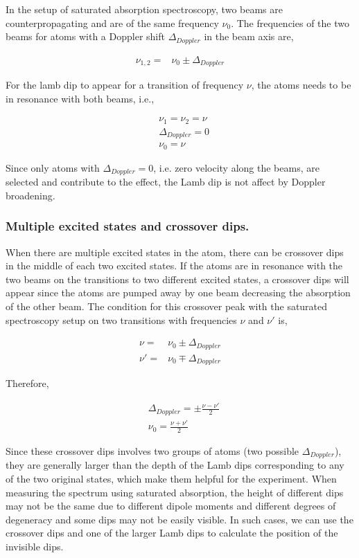 \documentclass[aps,twocolumn,secnumarabic,balancelastpage,amsmath,amssymb,nofootinbib]{revtex4}
\newcommand{\eqar}[1]
{
  \begin{align*}
    #1
  \end{align*}
}
\begin{document}
In the setup of saturated absorption spectroscopy, two beams are counterpropagating and are of the same frequency $\nu_0$. The frequencies of the two beams for atoms with a Doppler shift $\Delta_{Doppler}$ in the beam axis are,
\eqar{
  \nu_{1,2}=&\nu_0\pm\Delta_{Doppler}
}
For the lamb dip to appear for a transition of frequency $\nu$, the atoms needs to be in resonance with both beams, i.e.,
\eqar{
  &\nu_1=\nu_2=\nu\\
  &\Delta_{Doppler}=0\\
  &\nu_0=\nu
}
Since only atoms with $\Delta_{Doppler}=0$, i.e. zero velocity along the beams, are selected and contribute to the effect, the Lamb dip is not affect by Doppler broadening.
\subsubsection{Multiple excited states and crossover dips.}
When there are multiple excited states in the atom, there can be crossover dips in the middle of each two excited states. If the atoms are in resonance with the two beams on the transitions to two different excited states, a crossover dips will appear since the atoms are pumped away by one beam decreasing the absorption of the other beam. The condition for this crossover peak with the saturated spectroscopy setup on two transitions with frequencies $\nu$ and $\nu'$ is,
\eqar{
  \nu=&\nu_0\pm\Delta_{Doppler}\\
  \nu'=&\nu_0\mp\Delta_{Doppler}
}
Therefore,
\eqar{
  &\Delta_{Doppler}=\pm\frac{\nu-\nu'}{2}\\
  &\nu_0=\frac{\nu+\nu'}{2}
}

Since these crossover dips involves two groups of atoms (two possible $\Delta_{Doppler}$), they are generally larger than the depth of the Lamb dips corresponding to any of the two original states, which make them helpful for the experiment. When measuring the spectrum using saturated absorption, the height of different dips may not be the same due to different dipole moments and different degrees of degeneracy and some dips may not be easily visible. In such cases, we can use the crossover dips and one of the larger Lamb dips to calculate the position of the invisible dips.
\end{document}
